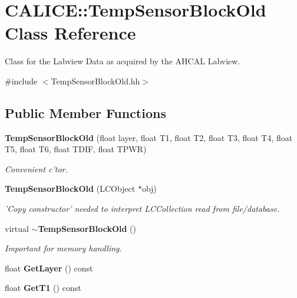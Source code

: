 \section{CALICE::TempSensorBlockOld Class Reference}
\label{classCALICE_1_1TempSensorBlockOld}


Class for the Labview Data as acquired by the AHCAL Labview.  


{\ttfamily \#include $<$TempSensorBlockOld.hh$>$}\subsection*{Public Member Functions}
\begin{DoxyCompactItemize}
\item 
{\bf TempSensorBlockOld} (float layer, float T1, float T2, float T3, float T4, float T5, float T6, float TDIF, float TPWR)\label{classCALICE_1_1TempSensorBlockOld_a82d44ba02d686f455a449b7973a84458}

\begin{DoxyCompactList}\small\item\em Convenient c'tor. \item\end{DoxyCompactList}\item 
{\bf TempSensorBlockOld} (LCObject $\ast$obj)\label{classCALICE_1_1TempSensorBlockOld_a8fa3c63309c635a015babba9cd9bcc5e}

\begin{DoxyCompactList}\small\item\em 'Copy constructor' needed to interpret LCCollection read from file/database. \item\end{DoxyCompactList}\item 
virtual {\bf $\sim$TempSensorBlockOld} ()\label{classCALICE_1_1TempSensorBlockOld_aa38e40270950ded8526b545854977c3c}

\begin{DoxyCompactList}\small\item\em Important for memory handling. \item\end{DoxyCompactList}\item 
float {\bfseries GetLayer} () const \label{classCALICE_1_1TempSensorBlockOld_ae6bf017ac104815ba921e869d089b995}

\item 
float {\bfseries GetT1} () const \label{classCALICE_1_1TempSensorBlockOld_a5a7ed17b117faae8ac76b9cc96e13296}


\end{DoxyCompactItemize}
